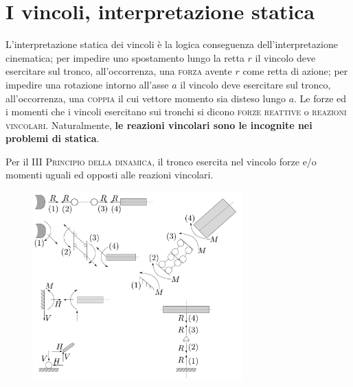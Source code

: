 \section{I vincoli, interpretazione statica}
\noindent L'interpretazione statica dei vincoli è la logica conseguenza dell'interpretazione cinematica; per impedire uno spostamento lungo la retta $r$ il vincolo deve esercitare sul tronco, all'occorrenza, una \textsc{forza} avente $r$ come retta di azione; per impedire una rotazione intorno all'asse $a$ il vincolo deve esercitare sul tronco, all'occorrenza, una \textsc{coppia} il cui vettore momento sia disteso lungo $a$. Le forze ed i momenti che i vincoli esercitano sui tronchi si dicono \textsc{forze reattive} o \textsc{reazioni vincolari}. Naturalmente, \textbf{le reazioni vincolari sono le incognite nei problemi di statica}.  

\noindent Per il \textsc{III Principio della dinamica}, il tronco esercita nel vincolo forze e/o momenti uguali ed opposti alle reazioni vincolari. 

\renewcommand{\thefigure}{7~-~3}
\begin{figure}[ht]
\centering
\includegraphics[width=0.72\textwidth]{Immagini/Parte_7/Figura7_3/Figura7_3.pdf}
\caption{}
\label{figura7-3}
\end{figure}

